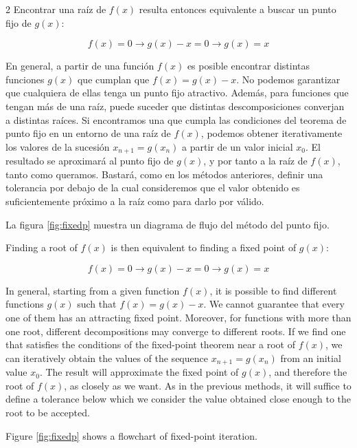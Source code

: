 \begin{paracol}{2}
Encontrar una raíz de $f(x)$ resulta entonces equivalente a buscar un punto fijo de $g(x)$:

\begin{equation*}
f(x)=0 \rightarrow g(x)-x=0 \rightarrow g(x)=x
\end{equation*}

En general, a partir de una función $f(x)$ es posible encontrar distintas funciones $g(x)$ que cumplan que $f(x)=g(x)-x$. No podemos garantizar que cualquiera de ellas tenga un punto fijo atractivo. Además, para funciones que tengan más de una raíz, puede suceder que distintas descomposiciones converjan a distintas raíces.
Si encontramos una que cumpla las condiciones del teorema de punto fijo en un entorno de una raíz de $f(x)$, podemos obtener iterativamente los valores de la sucesión $x_{n+1}=g(x_n)$ a partir de un valor inicial $x_0$. El resultado se aproximará al punto fijo de $g(x)$, y por tanto a la raíz de $f(x)$, tanto como queramos. Bastará, como en los métodos anteriores, definir una tolerancia por debajo de la cual consideremos que el valor obtenido es suficientemente próximo a la raíz como para darlo por válido.

La figura \ref{fig:fixedp} muestra un diagrama de flujo del método del punto fijo.
\switchcolumn


Finding a root of $f(x)$ is then equivalent to finding a fixed point of $g(x)$:

\begin{equation*}
f(x)=0 \rightarrow g(x)-x=0 \rightarrow g(x)=x
\end{equation*}

In general, starting from a given function $f(x)$, it is possible to find different functions $g(x)$ such that $f(x)=g(x)-x$. We cannot guarantee that every one of them has an attracting fixed point. Moreover, for functions with more than one root, different decompositions may converge to different roots.
If we find one that satisfies the conditions of the fixed-point theorem near a root of $f(x)$, we can iteratively obtain the values of the sequence $x_{n+1}=g(x_n)$ from an initial value $x_0$. The result will approximate the fixed point of $g(x)$, and therefore the root of $f(x)$, as closely as we want. As in the previous methods, it will suffice to define a tolerance below which we consider the value obtained close enough to the root to be accepted.

Figure \ref{fig:fixedp} shows a flowchart of fixed-point iteration.
\end{paracol}


